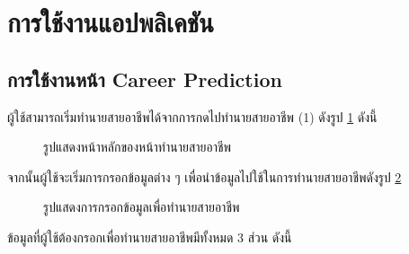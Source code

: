 \section{การใช้งานแอปพลิเคชัน}
\subsection{การใช้งานหน้า Career Prediction}
ผู้ใช้สามารถเริ่มทำนายสายอาชีพได้จากการกดไปทำนายสายอาชีพ (1) ดังรูป \ref{fig:start-CP} ดังนี้
\begin{figure}[H]\centering
    \caption{รูปแสดงหน้าหลักของหน้าทำนายสายอาชีพ}\label{fig:start-CP}
\end{figure}
จากนั้นผู้ใช้จะเริ่มการกรอกข้อมูลต่าง ๆ เพื่อนำข้อมูลไปใช้ในการทำนายสายอาชีพดังรูป \ref{fig:input-CP} 
\begin{figure}[H]\centering
    \caption{รูปแสดงการกรอกข้อมูลเพื่อทำนายสายอาชีพ}\label{fig:input-CP}
\end{figure}
ข้อมูลที่ผู้ใช้ต้องกรอกเพื่อทำนายสายอาชีพมีทั้งหมด 3 ส่วน ดังนี้

